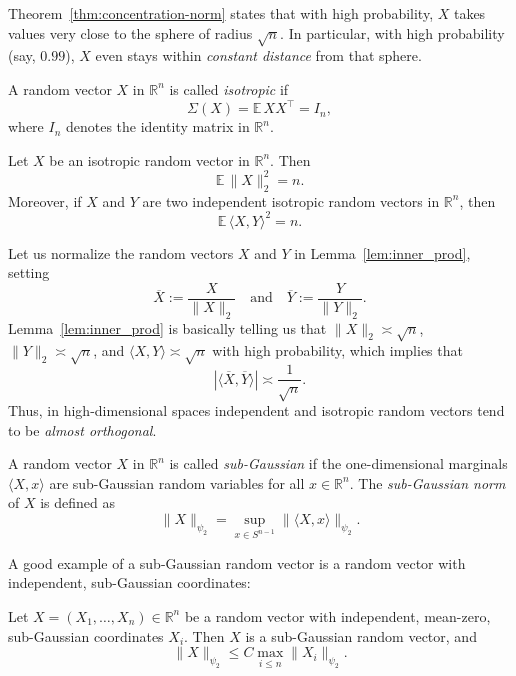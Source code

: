 \begin{rem}[Deviation]
Theorem~\ref{thm:concentration-norm} states that with high probability, $X$ takes values very close to the sphere of radius $\sqrt{n}$. In particular, with high probability (say, $0.99$), $X$ even stays within \emph{constant distance} from that sphere.
\end{rem}

\begin{defn}
A random vector $X$ in $\mathbb{R}^n$ is called \emph{isotropic} if
\[
\Sigma(X) = \mathbb{E}\, X X^\top = I_n,
\]
where $I_n$ denotes the identity matrix in $\mathbb{R}^n$.
\end{defn}

\begin{lem}
\label{lem:inner_prod}
Let $X$ be an isotropic random vector in $\mathbb{R}^n$. Then
\[
\mathbb{E}\, \|X\|_2^2 = n.
\]
Moreover, if $X$ and $Y$ are two independent isotropic random vectors in $\mathbb{R}^n$, then
\[
\mathbb{E}\, \langle X, Y \rangle^2 = n.
\]
\end{lem}


\begin{rem}
Let us normalize the random vectors $X$ and $Y$ in Lemma~\ref{lem:inner_prod}, setting
\[
\overline{X} := \frac{X}{\|X\|_2} \quad \text{and} \quad \overline{Y} := \frac{Y}{\|Y\|_2}.
\]
Lemma~\ref{lem:inner_prod} is basically telling us that $\|X\|_2 \asymp \sqrt{n}$, $\|Y\|_2 \asymp \sqrt{n}$, and $\langle X, Y \rangle \asymp \sqrt{n}$ with high probability, which implies that
\[
|\langle \overline{X}, \overline{Y} \rangle| \asymp \frac{1}{\sqrt{n}}.
\]
Thus, in high-dimensional spaces independent and isotropic random vectors tend to be \emph{almost orthogonal}.
\end{rem}

\begin{defn}
A random vector $X$ in $\mathbb{R}^n$ is called \emph{sub-Gaussian} if the one-dimensional marginals $\langle X, x \rangle$ are sub-Gaussian random variables for all $x \in \mathbb{R}^n$. The \emph{sub-Gaussian norm} of $X$ is defined as
\[
\|X\|_{\psi_2} = \sup_{x \in S^{n-1}} \|\langle X, x \rangle\|_{\psi_2}.
\]
\end{defn}

A good example of a sub-Gaussian random vector is a random vector with independent, sub-Gaussian coordinates:

\begin{lem}
Let $X = (X_1, \ldots, X_n) \in \mathbb{R}^n$ be a random vector with independent, mean-zero, sub-Gaussian coordinates $X_i$. Then $X$ is a sub-Gaussian random vector, and
\[
\|X\|_{\psi_2} \leq C \max_{i \leq n} \|X_i\|_{\psi_2}.
\]
\end{lem}

